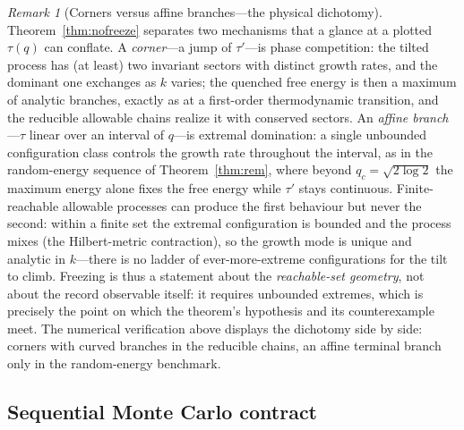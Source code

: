 \documentclass[aps,prx,reprint,superscriptaddress,nobibnotes,longbibliography]{revtex4-2}
\theoremstyle{remark}
\newtheorem{remark}{Remark}
\begin{document}
\begin{remark}[Corners versus affine branches---the physical dichotomy]
\label{rem:dichotomy}
Theorem~\ref{thm:nofreeze} separates two mechanisms that a glance at a
plotted $\tau(q)$ can conflate.  A \emph{corner}---a jump of
$\tau'$---is phase competition: the tilted process has (at least) two
invariant sectors with distinct growth rates, and the dominant one
exchanges as $k$ varies; the quenched free energy is then a maximum of
analytic branches, exactly as at a first-order thermodynamic transition,
and the reducible allowable chains realize it with conserved sectors.
An \emph{affine branch}---$\tau$ linear over an interval of $q$---is
extremal domination: a single unbounded configuration class controls
the growth rate throughout the interval, as in the random-energy
sequence of Theorem~\ref{thm:rem}, where beyond $q_c=\sqrt{2\log2}$ the
maximum energy alone fixes the free energy while $\tau'$ stays
continuous.  Finite-reachable allowable processes can produce the first
behaviour but never the second: within a finite set the extremal
configuration is bounded and the process mixes (the Hilbert-metric
contraction), so the growth mode is unique and analytic in $k$---there
is no ladder of ever-more-extreme configurations for the tilt to climb.
Freezing is thus a statement about the \emph{reachable-set geometry},
not about the record observable itself: it requires unbounded extremes,
which is precisely the point on which the theorem's hypothesis and its
counterexample meet.  The numerical verification above displays the
dichotomy side by side: corners with curved branches in the reducible
chains, an affine terminal branch only in the random-energy benchmark.
\end{remark}

\subsection{Sequential Monte Carlo contract}
\end{document}
